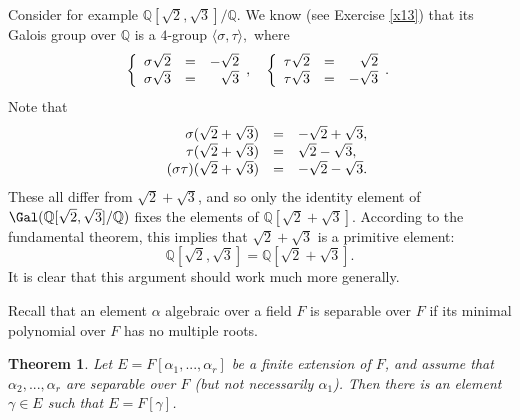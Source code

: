 \documentclass[a4paper,11pt,final,openany]{memoir}
\newtheorem{theorem}[X]{Theorem}
\theoremstyle{nonumberplain}
\begin{document}
Consider for example $\mathbb{Q}[\sqrt{2},\sqrt{3}]/\mathbb{Q}$. We know (see
Exercise \ref{x13}) that its Galois group over $\mathbb{Q}$ is a $4$-group
$\langle{}\sigma,\tau\rangle,$ where
\[
\left\{
\begin{array}
[c]{rrr}%
\sigma\sqrt{2} & = & -\sqrt{2}\\
\sigma\sqrt{3} & = & \sqrt{3}%
\end{array}
,\quad\left\{
\begin{array}
[c]{rrr}%
\tau\sqrt{2} & = & \sqrt{2}\\
\tau\sqrt{3} & = & -\sqrt{3}%
\end{array}
.\right.  \right.
\]
Note that
\[%
\begin{array}
[c]{rcl}%
\sigma(\sqrt{2}+\sqrt{3}) & = & -\sqrt{2}+\sqrt{3},\\
\quad\tau(\sqrt{2}+\sqrt{3}) & = & \sqrt{2}-\sqrt{3},\\
\quad(\sigma\tau)(\sqrt{2}+\sqrt{3}) & = & -\sqrt{2}-\sqrt{3}.
\end{array}
\]
These all differ from $\sqrt{2}+\sqrt{3}$, and so only the identity element of
$\Gal(\mathbb{Q}[\sqrt{2},\sqrt{3}]/\mathbb{Q})$ fixes the elements of
$\mathbb{Q}[\sqrt{2}+\sqrt{3}]$. According to the fundamental theorem, this
implies that $\sqrt{2}+\sqrt{3}$ is a primitive element:
\[
\mathbb{Q}[\sqrt{2},\sqrt{3}]=\mathbb{Q}[\sqrt{2}+\sqrt{3}].
\]
It is clear that this argument should work much more generally.

Recall that an element $\alpha$ algebraic over a field $F$ is separable\/%
over $F$ if its minimal polynomial over $F$ has no multiple roots.

\begin{theorem}
\label{ag1} Let $E=F[\alpha_{1},...,\alpha_{r}]$ be a finite extension of $F$,
and assume that $\alpha_{2},...,\alpha_{r}$ are separable over $F$ (but not
necessarily $\alpha_{1}$). Then there is an element $\gamma\in E$ such that
$E=F[\gamma]$.
\end{theorem}
\end{document}
